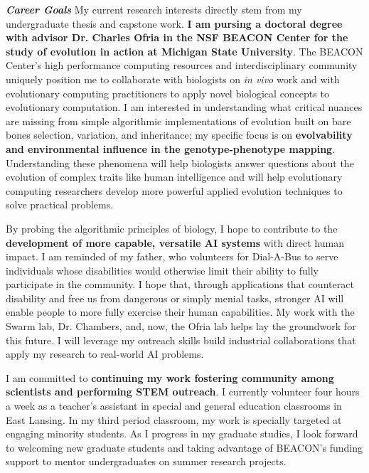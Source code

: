 \textit{\textbf{Career Goals}}
My current research interests directly stem from my undergraduate thesis and capstone work.
\textbf{I am pursing a doctoral degree with advisor Dr. Charles Ofria in the NSF BEACON Center for the study of evolution in action at Michigan State University}.
The BEACON Center's high performance computing resources and interdisciplinary community uniquely position me to collaborate with biologists on \textit{in vivo} work and with evolutionary computing practitioners to apply novel biological concepts to evolutionary computation.
I am interested in understanding what critical nuances are missing from simple algorithmic implementations of evolution built on bare bones selection, variation, and inheritance;
my specific focus is on \textbf{evolvability and environmental influence in the genotype-phenotype mapping}.
Understanding these phenomena will help biologists answer questions about the evolution of complex traits like human intelligence and will help evolutionary computing researchers develop more powerful applied evolution techniques to solve practical problems.

By probing the algorithmic principles of biology, I hope to contribute to the \textbf{development of more capable, versatile AI systems} with direct human impact.
I am reminded of my father, who volunteers for Dial-A-Bus to serve individuals whose disabilities would otherwise limit their ability to fully participate in the community.
I hope that, through applications that counteract disability and free us from dangerous or simply menial tasks, stronger AI will enable people to more fully exercise their human capabilities.
My work with the Swarm lab, Dr. Chambers, and, now, the Ofria lab helps lay the groundwork for this future.
I will leverage my outreach skills build industrial collaborations that apply my research to real-world AI problems.

I am committed to \textbf{continuing my work fostering community among scientists and performing STEM outreach}.
I currently volunteer four hours a week as a teacher's assistant in special and general education classrooms in East Lansing.
In my third period classroom, my work is specially targeted at engaging minority students.
As I progress in my graduate studies, I look forward to welcoming new graduate students and taking advantage of BEACON's funding support to mentor undergraduates on summer research projects.
